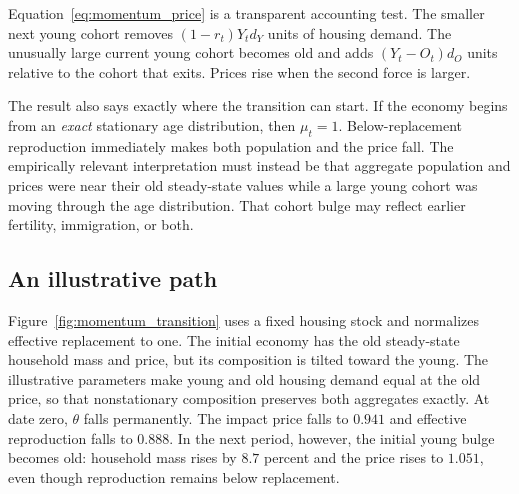 \documentclass[11pt]{article}
\theoremstyle{definition}
\begin{document}
Equation~\eqref{eq:momentum_price} is a transparent accounting test. The
smaller next young cohort removes $(1-r_t)Y_t d_Y$ units of housing demand. The
unusually large current young cohort becomes old and adds
$(Y_t-O_t)d_O$ units relative to the cohort that exits. Prices rise when the
second force is larger.

The result also says exactly where the transition can start. If the economy
begins from an \emph{exact} stationary age distribution, then $\mu_t=1$.
Below-replacement reproduction immediately makes both population and the price
fall. The empirically relevant interpretation must instead be that aggregate
population and prices were near their old steady-state values while a large
young cohort was moving through the age distribution. That cohort bulge may
reflect earlier fertility, immigration, or both.

\subsection*{An illustrative path}

Figure~\ref{fig:momentum_transition} uses a fixed housing stock and normalizes
effective replacement to one. The initial economy has the old steady-state
household mass and price, but its composition is tilted toward the young. The
illustrative parameters make young and old housing demand equal at the old
price, so that nonstationary composition preserves both aggregates exactly.
At date zero, $\theta$ falls permanently. The impact price falls to $0.941$ and
effective reproduction falls to $0.888$. In the next period, however, the
initial young bulge becomes old: household mass rises by $8.7$ percent and the
price rises to $1.051$, even though reproduction remains below replacement.
\end{document}

